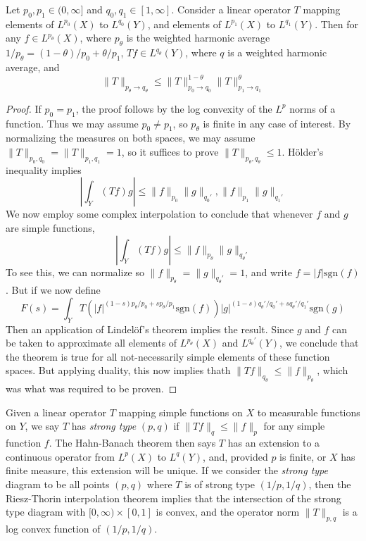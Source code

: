 \begin{theorem}
    Let $p_0,p_1 \in (0,\infty]$ and $q_0,q_1 \in [1,\infty]$. Consider a linear operator $T$ mapping elements of $L^{p_0}(X)$ to $L^{q_0}(Y)$, and elements of $L^{p_1}(X)$ to $L^{q_1}(Y)$. Then for any $f \in L^{p_\theta}(X)$, where $p_\theta$ is the weighted harmonic average $1/p_\theta = (1 - \theta)/p_0 + \theta/p_1$, $Tf \in L^{q_\theta}(Y)$, where $q$ is a weighted harmonic average, and
    \[ \| T \|_{p_\theta \to q_\theta} \leq \| T \|_{p_0 \to q_0}^{1-\theta} \| T \|_{p_1 \to q_1}^\theta \]
\end{theorem}
\begin{proof}
    If $p_0 = p_1$, the proof follows by the log convexity of the $L^p$ norms of a function. Thus we may assume $p_0 \neq p_1$, so $p_\theta$ is finite in any case of interest. By normalizing the measures on both spaces, we may assume $\| T \|_{p_0,q_0} = \| T \|_{p_1,q_1} = 1$, so it suffices to prove $\| T \|_{p_\theta,q_\theta} \leq 1$. H\"{o}lder's inequality implies
    \[ \left| \int_Y (Tf) g \right| \leq \| f \|_{p_0} \| g \|_{q_0'}, \| f \|_{p_1} \| g \|_{q_1'} \]
    We now employ some complex interpolation to conclude that whenever $f$ and $g$ are simple functions,
    \[ \left| \int_Y (Tf) g \right| \leq \| f \|_{p_\theta} \| g \|_{q_\theta'} \]
    To see this, we can normalize so $\| f \|_{p_\theta} = \| g \|_{q_\theta'} = 1$, and write $f = |f| \text{sgn}(f)$. But if we now define
    \[ F(s) = \int_Y T(|f|^{(1-s)p_\theta/p_0 + sp_\theta/p_1} \text{sgn}(f)) |g|^{(1-s)q_\theta'/q_0' + sq_\theta'/q_1'} \text{sgn}(g) \]
    Then an application of Lindel\"{o}f's theorem implies the result. Since $g$ and $f$ can be taken to approximate all elements of $L^{p_\theta}(X)$ and $L^{q_\theta'}(Y)$, we conclude that the theorem is true for all not-necessarily simple elements of these function spaces. But applying duality, this now implies thath $\| Tf \|_{q_\theta} \leq \| f \|_{p_\theta}$, which was what was required to be proven.
\end{proof}

Given a linear operator $T$ mapping simple functions on $X$ to measurable functions on $Y$, we say $T$ has {\it strong type} $(p,q)$ if $\| T f \|_q \leq \| f \|_p$ for any simple function $f$. The Hahn-Banach theorem then says $T$ has an extension to a continuous operator from $L^p(X)$ to $L^q(Y)$, and, provided $p$ is finite, or $X$ has finite measure, this extension will be unique. If we consider the {\it strong type} diagram to be all points $(p,q)$ where $T$ is of strong type $(1/p,1/q)$, then the Riesz-Thorin interpolation theorem implies that the intersection of the strong type diagram with $[0,\infty) \times [0,1]$ is convex, and the operator norm $\| T \|_{p,q}$ is a log convex function of $(1/p,1/q)$.

